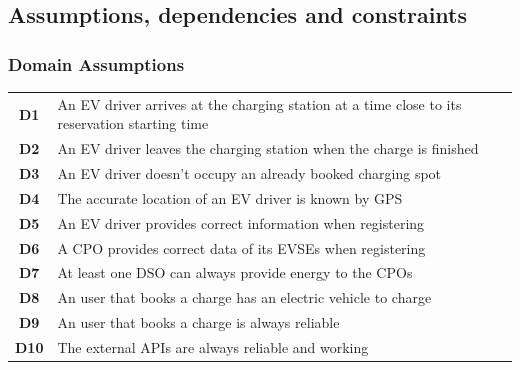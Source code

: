 \subsection{Assumptions, dependencies and constraints}
\subsubsection*{Domain Assumptions}
\begin{table}[H]
      \begin{tabularx}{\textwidth}{cX}
            \toprule
            \textbf{D1}  & An EV driver arrives at the charging station at a time close to its reservation starting time \\
            \textbf{D2}  & An EV driver leaves the charging station when the charge is finished                          \\
            \textbf{D3}  & An EV driver doesn't occupy an already booked charging spot                                   \\
            \textbf{D4}  & The accurate location of an EV driver is known by GPS                                         \\
            \textbf{D5}  & An EV driver provides correct information when registering                                    \\
            \textbf{D6}  & A CPO provides correct data of its EVSEs when registering                                     \\
            \textbf{D7}  & At least one DSO can always provide energy to the CPOs                                        \\
            \textbf{D8}  & An user that books a charge has an electric vehicle to charge                                 \\
            \textbf{D9}  & An user that books a charge is always reliable                                                \\
            \textbf{D10} & The external APIs are always reliable and working                                             \\
            \bottomrule
      \end{tabularx}
\end{table}
